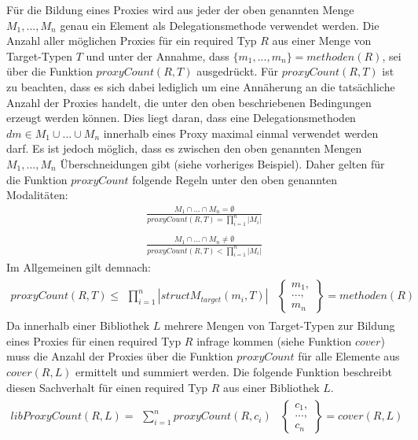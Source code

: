 \documentclass[a4paper,12pt]{article}
\begin{document}
Für die Bildung eines Proxies wird aus jeder der oben genannten Menge $M_1,...,M_n$ genau ein Element als Delegationsmethode verwendet werden. Die Anzahl aller möglichen Proxies für ein required Typ $R$ aus einer Menge von Target-Typen $T$ und unter der Annahme, dass $\{m_1,...,m_n\} = \mathit{methoden(R)}$, sei über die Funktion $\mathit{proxyCount(R,T)}$ ausgedrückt. Für $\mathit{proxyCount(R,T)}$ ist zu beachten, dass es sich dabei lediglich um eine Annäherung an die tatsächliche Anzahl der Proxies handelt, die unter den oben beschriebenen Bedingungen erzeugt werden können. Dies liegt daran, dass eine Delegationsmethoden $dm \in M_1 \cup ... \cup M_n$ innerhalb eines Proxy maximal einmal verwendet werden darf. Es ist jedoch möglich, dass es zwischen den oben genannten Mengen 
$M_1,...,M_n$ Überschneidungen gibt (siehe vorheriges Beispiel). Daher gelten für die Funktion $\mathit{proxyCount}$ folgende Regeln unter den oben genannten Modalitäten:
\begin{gather*}
\frac{M_1 \cap ... \cap M_n = \emptyset}{\mathit{proxyCount(R,T)} = \prod\limits_{i=1}^{n}|M_i| }
\\\\
\frac{M_1 \cap ... \cap M_n \neq \emptyset}{\mathit{proxyCount(R,T)} < \prod\limits_{i=1}^{n}|M_i| }
\end{gather*}
\noindent
Im Allgemeinen gilt demnach:
\begin{gather*}
\mathit{proxyCount(R,T)} \leq 
\begin{array}{l|l}
\prod\limits_{i=1}^{n}|\mathit{structM_{target}(m_i, T)}|
&
\left\{
\begin{array}{l}
m_1,\\
...,\\
m_n
\end{array}
\right\}
= \mathit{methoden(R)}
\end{array}
\end{gather*}
Da innerhalb einer Bibliothek $L$ mehrere Mengen von Target-Typen zur Bildung eines Proxies für einen required Typ $R$ infrage kommen (siehe Funktion $\mathit{cover}$) muss die Anzahl der Proxies über die Funktion $\mathit{proxyCount}$ für alle Elemente aus $\mathit{cover(R,L)}$ ermittelt und summiert werden. Die folgende Funktion beschreibt diesen Sachverhalt für einen required Typ $R$ aus einer Bibliothek $L$.
\begin{gather*}
\mathit{libProxyCount(R,L)} = 
\begin{array}{l|l}
\sum_{i=1}^{n}\mathit{proxyCount(R,c_i)}
&
\left\{
\begin{array}{l}
c_1,\\
...,\\
c_n
\end{array}
\right\} = \mathit{cover(R,L)}
\end{array}
\end{gather*}
\end{document}
